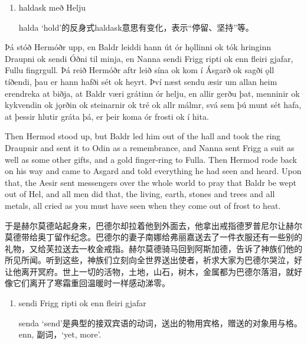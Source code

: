 \begin{grammar*}{}
  \begin{enumerate}[leftmargin=*]
    \item haldask með Helju

          halda `hold'的反身式haldask意思有变化，表示“停留、坚持”等。
  \end{enumerate}
\end{grammar*}
\begin{paracol}{2}
  Þá stóð Hermóðr upp, en Baldr leiddi hann út ór hǫllinni ok tók hringinn Draupni ok sendi Óðni til minja, en Nanna sendi Frigg ripti ok enn fleiri gjafar, Fullu fingrgull. Þá reið Hermóðr aftr leið sína ok kom í Ásgarð ok sagði ǫll tíðendi, þau er hann hafði sét ok heyrt. Því næst sendu æsir um allan heim erendreka at biðja, at Baldr væri grátinn ór helju, en allir gerðu þat, menninir ok kykvendin ok jǫrðin ok steinarnir ok tré ok allr málmr, svá sem þú munt sét hafa, at þessir hlutir gráta þá, er þeir koma ór frosti ok í hita.

  \switchcolumn

  Then Hermod stood up, but Baldr led him out of the hall and took the ring Draupnir and sent it to Odin as a remembrance, and Nanna sent Frigg a suit as well as some other gifts, and a gold finger-ring to Fulla. Then Hermod rode back on his way and came to Asgard and told everything he had seen and heard. Upon that, the Aesir sent messengers over the whole world to pray that Baldr be wept out of Hel, and all men did that, the living, earth, stones and trees and all metals, all cried as you must have seen when they come out of frost to heat.
\end{paracol}
\begin{translation*}{}
  于是赫尔莫德站起身来，巴德尔却拉着他到外面去，他拿出戒指德罗普尼尔让赫尔莫德带给奥丁留作纪念。巴德尔的妻子南娜给弗丽嘉送去了一件衣服还有一些别的礼物，又给芙拉送去一枚金戒指。赫尔莫德骑马回到阿斯加德，告诉了神族们他的所见所闻。听到这些，神族们立刻向全世界送出使者，祈求大家为巴德尔哭泣，好让他离开冥府。世上一切的活物，土地，山石，树木，金属都为巴德尔落泪，就好像它们离开了寒霜重回温暖时一样感动涕零。
\end{translation*}
\begin{grammar*}{}
  \begin{enumerate}[leftmargin=*]
    \item sendi Frigg ripti ok enn fleiri gjafar

          senda `send'是典型的接双宾语的动词，送出的物用宾格，赠送的对象用与格。enn, 副词，`yet, more'.
  \end{enumerate}
\end{grammar*}
